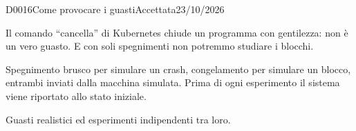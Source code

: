 \begin{decisione}{D0016}{Come provocare i guasti}{Accettata}{23/10/2026}

\contesto
Il comando ``cancella'' di Kubernetes chiude un programma con gentilezza: non è un vero guasto. E con soli spegnimenti non potremmo studiare i blocchi.

\scelta
Spegnimento brusco per simulare un crash, congelamento per simulare un blocco, entrambi inviati dalla macchina simulata. Prima di ogni esperimento il sistema viene riportato allo stato iniziale.

\conseguenze
Guasti realistici ed esperimenti indipendenti tra loro.

\end{decisione}
